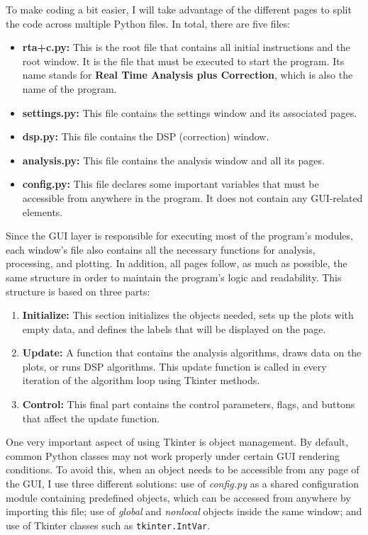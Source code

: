 To make coding a bit easier, I will take advantage of the different pages to split the code across multiple Python files. In total, there are five files:

\begin{itemize}
	\item \textbf{rta+c.py:} This is the root file that contains all initial instructions and the root window. It is the file that must be executed to start the program. Its name stands for \textbf{Real Time Analysis plus Correction}, which is also the name of the program.
	\item \textbf{settings.py:} This file contains the settings window and its associated pages.
	\item \textbf{dsp.py:} This file contains the DSP (correction) window.
	\item \textbf{analysis.py:} This file contains the analysis window and all its pages.
	\item \textbf{config.py:} This file declares some important variables that must be accessible from anywhere in the program. It does not contain any GUI-related elements.
\end{itemize}

Since the GUI layer is responsible for executing most of the program’s modules, each window’s file also contains all the necessary functions for analysis, processing, and plotting. In addition, all pages follow, as much as possible, the same structure in order to maintain the program’s logic and readability. This structure is based on three parts:

\begin{enumerate}
	\item \textbf{Initialize:} This section initializes the objects needed, sets up the plots with empty data, and defines the labels that will be displayed on the page.
	\item \textbf{Update:} A function that contains the analysis algorithms, draws data on the plots, or runs DSP algorithms. This update function is called in every iteration of the algorithm loop using Tkinter methods.
	\item \textbf{Control:} This final part contains the control parameters, flags, and buttons that affect the update function.
\end{enumerate}

One very important aspect of using Tkinter is object management. By default, common Python classes may not work properly under certain GUI rendering conditions. To avoid this, when an object needs to be accessible from any page of the GUI, I use three different solutions: use of \textit{config.py} as a shared configuration module containing predefined objects, which can be accessed from anywhere by importing this file; use of \textit{global} and \textit{nonlocal} objects inside the same window; and use of Tkinter classes such as \texttt{tkinter.IntVar}.

